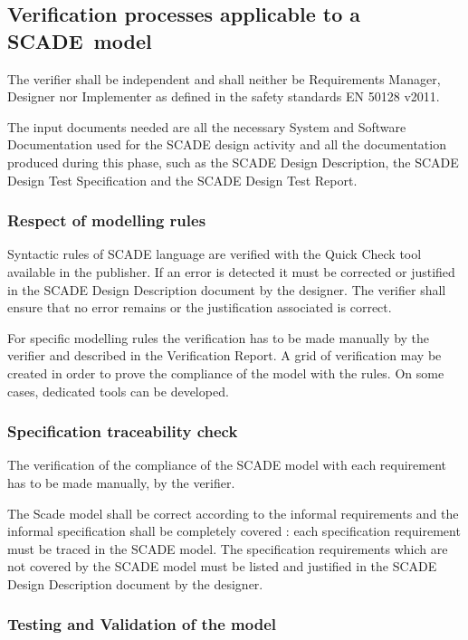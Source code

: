 \subsection{Verification processes applicable to a\\SCADE~model}

The verifier shall be independent and shall neither be Requirements Manager, Designer nor Implementer as defined in the safety standards EN 50128 v2011.

The input documents needed are all the necessary System and Software Documentation used for the SCADE design activity and all the documentation produced during this phase, such as the SCADE Design Description, the SCADE Design Test Specification and the SCADE Design Test Report.

\subsubsection{Respect of modelling rules}

Syntactic rules of SCADE language are verified with the Quick Check tool available in the publisher. If an error is detected it must be corrected or justified in the SCADE Design Description document by the designer. The verifier shall ensure that no error remains or the justification associated is correct.

For specific modelling rules the verification has to be made manually by the verifier and described in the Verification Report. A grid of verification may be created in order to prove the compliance of the model with the rules. On some cases, dedicated tools can be developed.

\subsubsection{Specification traceability check}

The verification of the compliance of the SCADE model with each requirement has to be made manually, by the verifier. 

The Scade model shall be correct according to the informal requirements and the informal specification shall be completely covered : each specification requirement must be traced in the SCADE model. The specification requirements which are not covered by the SCADE model must be listed and justified in the SCADE Design Description document by the designer.

\subsubsection{Testing and Validation of the model}

